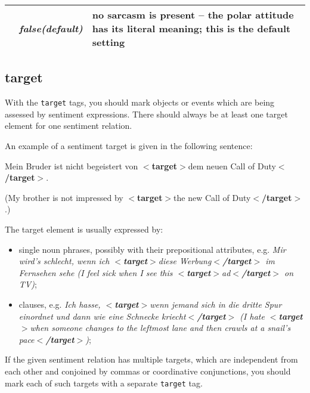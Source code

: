 \documentclass[11pt,a4paper]{article}
\newcommand{\xmltag}[1]{{\textbf{\small$<$#1$>$}}}
\newcommand{\target}[1]{\xmltag{target}#1\xmltag{/target}}
\newlength\clmnwidth
\newenvironment{myexe}{
  \begin{exe}
    \ex\begin{center}
    \itshape
}{
    \end{center}
  \end{exe}
}
\begin{document}
\begin{center}
\begin{tabular}{|l|c|p{\clmnwidth}|}
    & \textit{false\newline(default)} & no sarcasm is present -- the
    polar attitude has its literal meaning; this is the default
    setting\\\hline
  \end{tabular}
\end{center}

\subsection{target}
With the \texttt{target} tags, you should mark objects or events which
are being assessed by sentiment expressions.  There should always be
at least one target element for one sentiment relation.

An example of a sentiment target is given in the following sentence:
\begin{myexe}
Mein Bruder ist nicht begeistert von \target{dem neuen Call of Duty}.

(My brother is not impressed by \target{the new Call of Duty}.)
\end{myexe}

The target element is usually expressed by:
\begin{itemize}
\item single noun phrases, possibly with their prepositional attributes,
  e.g. \textit{Mir wird's schlecht, wenn ich \target{diese Werbung} im
    Fernsehen sehe (I feel sick when I see this \target{ad} on TV)};

\item clauses, e.g. \textit{Ich hasse, \target{wenn jemand sich in die dritte
    Spur einordnet und dann wie eine Schnecke kriecht} (I hate \target{when
    someone changes to the leftmost lane and then crawls at a snail's pace})};
\end{itemize}

If the given sentiment relation has multiple targets, which are independent
from each other and conjoined by commas or coordinative conjunctions, you
should mark each of such targets with a separate \texttt{target} tag.

\end{document}
